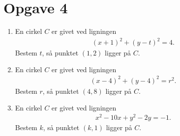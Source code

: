 \section*{Opgave 4}
\begin{enumerate}[label=\roman*)]
	\item En cirkel $C$ er givet ved ligningen
	\begin{align*}
		(x+1)^2+(y-t)^2 = 4.
	\end{align*}
	Bestem $t$, så punktet $(1,2)$ ligger på $C$.
	\item En cirkel $C$ er givet ved ligningen
	\begin{align*}
		(x-4)^2 + (y-4)^2 = r^2.
	\end{align*}
	Bestem $r$, så punktet $(4,8)$ ligger på $C$.
	\item En cirkel $C$ er givet ved ligningen
	\begin{align*}
		x^2-10x+y^2-2y=-1.
	\end{align*}
	Bestem $k$, så punktet $(k,1)$ ligger på $C$.
\end{enumerate}